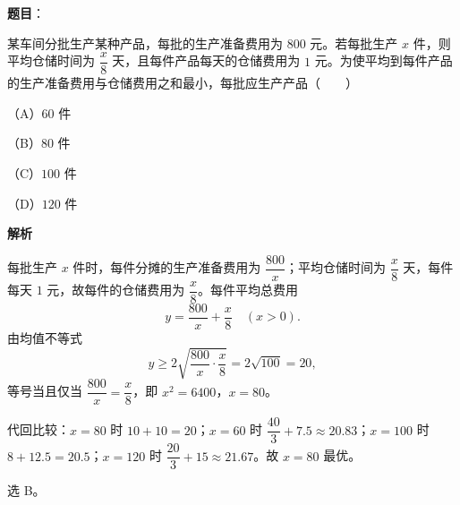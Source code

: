 \begin{answer}

\textbf{题目}：

某车间分批生产某种产品，每批的生产准备费用为 $800$ 元。若每批生产 $x$ 件，则平均仓储时间为 $\dfrac x8$ 天，且每件产品每天的仓储费用为 $1$ 元。为使平均到每件产品的生产准备费用与仓储费用之和最小，每批应生产产品\mbox{（　　）}

（A）$60$ 件

（B）$80$ 件

（C）$100$ 件

（D）$120$ 件

\textbf{解析}

每批生产 $x$ 件时，每件分摊的生产准备费用为 $\dfrac{800}{x}$；平均仓储时间为 $\dfrac x8$ 天，每件每天 $1$ 元，故每件的仓储费用为 $\dfrac x8$。每件平均总费用
\nopagebreak[4]
\[
y=\frac{800}{x}+\frac x8\quad(x>0).
\]
由均值不等式
\nopagebreak[4]
\[
y\geqslant2\sqrt{\frac{800}{x}\cdot\frac x8}=2\sqrt{100}=20,
\]
等号当且仅当 $\dfrac{800}{x}=\dfrac x8$，即 $x^2=6400$，$x=80$。

代回比较：$x=80$ 时 $10+10=20$；$x=60$ 时 $\dfrac{40}{3}+7.5\approx20.83$；$x=100$ 时 $8+12.5=20.5$；$x=120$ 时 $\dfrac{20}{3}+15\approx21.67$。故 $x=80$ 最优。

选 B。


\end{answer}
